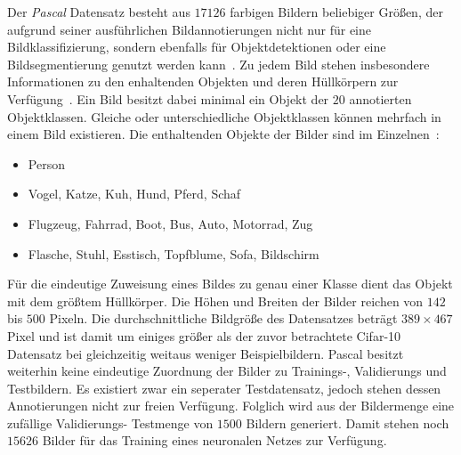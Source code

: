 Der \emph{\gls{Pascal}} Datensatz besteht aus $17126$ farbigen Bildern beliebiger Größen, der aufgrund seiner ausführlichen Bildannotierungen nicht nur für eine Bildklassifizierung, sondern ebenfalls für Objektdetektionen oder eine Bildsegmentierung genutzt werden kann~\cite{pascal_voc}.
Zu jedem Bild stehen insbesondere Informationen zu den enhaltenden Objekten und deren Hüllkörpern zur Verfügung~\cite{pascal_voc}.
Ein Bild besitzt dabei minimal ein Objekt der $20$ annotierten Objektklassen.
Gleiche oder unterschiedliche Objektklassen können mehrfach in einem Bild existieren.
Die enthaltenden Objekte der Bilder sind im Einzelnen~\cite{pascal_voc}:
\begin{itemize}
  \item Person
  \item Vogel, Katze, Kuh, Hund, Pferd, Schaf
  \item Flugzeug, Fahrrad, Boot, Bus, Auto, Motorrad, Zug
  \item Flasche, Stuhl, Esstisch, Topfblume, Sofa, Bildschirm
\end{itemize}
Für die eindeutige Zuweisung eines Bildes zu genau einer Klasse dient das Objekt mit dem größtem Hüllkörper.
Die Höhen und Breiten der Bilder reichen von $142$ bis $500$ Pixeln.
Die durchschnittliche Bildgröße des Datensatzes beträgt $389 \times 467$ Pixel und ist damit um einiges größer als der zuvor betrachtete \gls{Cifar}-10 Datensatz bei gleichzeitig weitaus weniger Beispielbildern.
\gls{Pascal} besitzt weiterhin keine eindeutige Zuordnung der Bilder zu Trainings-, Validierungs und Testbildern.
Es existiert zwar ein seperater Testdatensatz, jedoch stehen dessen Annotierungen nicht zur freien Verfügung.
Folglich wird aus der Bildermenge eine zufällige Validierungs- \bzw{} Testmenge von $1500$ Bildern generiert.
Damit stehen noch $15626$ Bilder für das Training eines neuronalen Netzes zur Verfügung.

